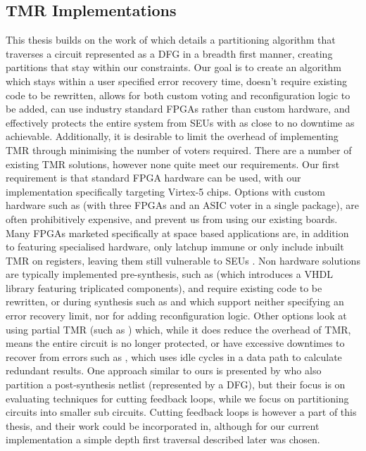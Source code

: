 \documentclass[12pt,final,oneside]{dwThesis} %
\begin{document}
   \subsection{\acl{TMR} Implementations}
   This thesis builds on the work of\cite{DiesselChange} which details a partitioning algorithm that traverses a circuit represented as a \ac{DFG} in a breadth first manner, creating partitions that stay within our constraints.
   Our goal is to create an algorithm which stays within a user specified error recovery time, doesn't require existing code to be rewritten, allows for both custom voting and reconfiguration logic to be added, can use industry standard \acp{FPGA} rather than custom hardware, and effectively protects the entire system from \acp{SEU} with as close to no downtime as achievable.
   Additionally, it is desirable to limit the overhead of implementing \ac{TMR} through minimising the number of voters required.
   There are a number of existing \ac{TMR} solutions, however none quite meet our requirements.
   Our first requirement is that standard \ac{FPGA} hardware can be used, with our implementation specifically targeting Virtex-5 chips. Options with custom hardware such as \cite{VFPGATMR} (with three \acp{FPGA} and an \ac{ASIC} voter in a single package), are often prohibitively expensive, and prevent us from using our existing boards.
   Many \acp{FPGA} marketed specifically at space based applications are, in addition to featuring specialised hardware, only latchup immune or only include inbuilt \ac{TMR} on registers, leaving them still vulnerable to \acp{SEU} \cite{FPGAReview}.
   Non hardware solutions are typically implemented pre-synthesis, such as \cite{ftmr} (which introduces a \ac{VHDL} library featuring triplicated components), and require existing code to be rewritten, or during synthesis such as \cite{synplify} and \cite{tmrtool} which support neither specifying an error recovery limit, nor for adding reconfiguration logic.
   Other options look at using partial \ac{TMR} (such as \cite{partialTMR}) which, while it does reduce the overhead of \ac{TMR}, means the entire circuit is no longer protected, or have excessive downtimes to recover from errors such as \cite{VTMR}, which uses idle cycles in a data path to calculate redundant results.
   One approach similar to ours is presented by \cite{PostSynth} who also partition a post-synthesis netlist (represented by a \ac{DFG}), but their focus is on evaluating techniques for cutting feedback loops, while we focus on partitioning circuits into smaller sub circuits. Cutting feedback loops is however a part of this thesis, and their work could be incorporated in, although for our current implementation a simple depth first traversal described later was chosen.
\end{document}

